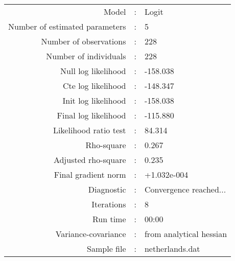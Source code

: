 

\begin{flushleft}
\begin{tabular}{rcl}
\hline
Model &:& Logit\\
Number of estimated parameters&:&5\\
Number of  observations &:& 228\\
Number of individuals&:&228\\
Null log likelihood&:&-158.038\\
Cte log likelihood&:&-148.347\\
Init log likelihood&:&-158.038\\
Final log likelihood&:&-115.880\\
Likelihood ratio test &:&84.314\\
Rho-square&:&0.267\\
Adjusted rho-square&:&0.235\\
Final gradient norm&:&+1.032e-004\\
Diagnostic&:&Convergence reached...\\
Iterations&:&8\\
Run time&:&00:00\\
Variance-covariance&:&from analytical hessian
\\
Sample file&:&netherlands.dat\\
\end{tabular}
\end{flushleft}
